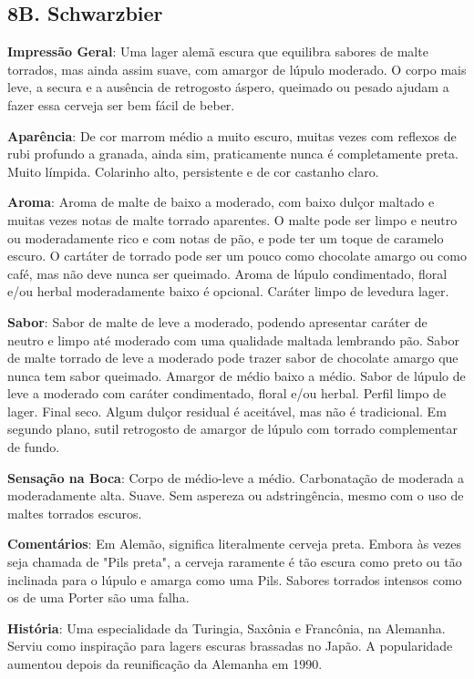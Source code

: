 \subsection*{8B. Schwarzbier}

\textbf{Impressão Geral}: Uma lager alemã escura que equilibra sabores de malte torrados, mas ainda assim suave, com amargor de lúpulo moderado. O corpo mais leve, a secura e a ausência de retrogosto áspero, queimado ou pesado ajudam a fazer essa cerveja ser bem fácil de beber.

\textbf{Aparência}: De cor marrom médio a muito escuro, muitas vezes com reflexos de rubi profundo a granada, ainda sim, praticamente nunca é completamente preta. Muito límpida. Colarinho alto, persistente e de cor castanho claro.

\textbf{Aroma}: Aroma de malte de baixo a moderado, com baixo dulçor maltado e muitas vezes notas de malte torrado aparentes. O malte pode ser limpo e neutro ou moderadamente rico e com notas de pão, e pode ter um toque de caramelo escuro. O cartáter de torrado pode ser um pouco como chocolate amargo ou como café, mas não deve nunca ser queimado. Aroma de lúpulo condimentado, floral e/ou herbal moderadamente baixo é opcional. Caráter limpo de levedura lager.

\textbf{Sabor}: Sabor de malte de leve a moderado, podendo apresentar caráter de neutro e limpo até moderado com uma qualidade maltada lembrando pão. Sabor de malte torrado de leve a moderado pode trazer sabor de chocolate amargo que nunca tem sabor queimado. Amargor de médio baixo a médio. Sabor de lúpulo de leve a moderado com caráter condimentado, floral e/ou herbal. Perfil limpo de lager. Final seco. Algum dulçor residual é aceitável, mas não é tradicional. Em segundo plano, sutil retrogosto de amargor de lúpulo com torrado complementar de fundo.

\textbf{Sensação na Boca}: Corpo de médio-leve a médio. Carbonatação de moderada a moderadamente alta. Suave. Sem aspereza ou adstringência, mesmo com o uso de maltes torrados escuros.

\textbf{Comentários}: Em Alemão, significa literalmente cerveja preta. Embora às vezes seja chamada de "Pils preta", a cerveja raramente é tão escura como preto ou tão inclinada para o lúpulo e amarga como uma Pils. Sabores torrados intensos como os de uma Porter são uma falha.

\textbf{História}: Uma especialidade da Turingia, Saxônia e Francônia, na Alemanha. Serviu como inspiração para lagers escuras brassadas no Japão. A popularidade aumentou depois da reunificação da Alemanha em 1990.

